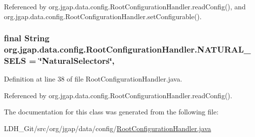 Referenced by org.\-jgap.\-data.\-config.\-Root\-Configuration\-Handler.\-read\-Config(), and org.\-jgap.\-data.\-config.\-Root\-Configuration\-Handler.\-set\-Configurable().

\hypertarget{classorg_1_1jgap_1_1data_1_1config_1_1_root_configuration_handler_aaa4a3397aaa566ff34c7aa421b4527dc}{
\subsubsection[{N\-A\-T\-U\-R\-A\-L\-\_\-\-S\-E\-L\-S}]{\setlength{\rightskip}{0pt plus 5cm}final String org.\-jgap.\-data.\-config.\-Root\-Configuration\-Handler.\-N\-A\-T\-U\-R\-A\-L\-\_\-\-S\-E\-L\-S = \char`\"{}Natural\-Selectors\char`\"{}\hspace{0.3cm}{\ttfamily [static]}, {\ttfamily [private]}}}\label{classorg_1_1jgap_1_1data_1_1config_1_1_root_configuration_handler_aaa4a3397aaa566ff34c7aa421b4527dc}


Definition at line 38 of file Root\-Configuration\-Handler.\-java.



Referenced by org.\-jgap.\-data.\-config.\-Root\-Configuration\-Handler.\-read\-Config().



The documentation for this class was generated from the following file\-:\begin{DoxyCompactItemize}
\item 
L\-D\-H\-\_\-\-Git/src/org/jgap/data/config/\hyperlink{_root_configuration_handler_8java}{Root\-Configuration\-Handler.\-java}\end{DoxyCompactItemize}
